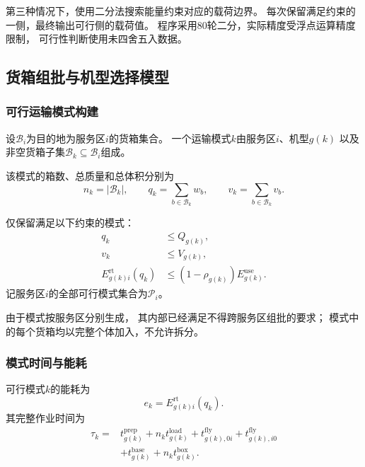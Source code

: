 \documentclass[bwprint]{gmcmthesis}
\begin{document}
第三种情况下，使用二分法搜索能量约束对应的载荷边界。
每次保留满足约束的一侧，最终输出可行侧的载荷值。
程序采用80轮二分，实际精度受浮点运算精度限制，
可行性判断使用未四舍五入数据。

\subsection{货箱组批与机型选择模型}

\subsubsection{可行运输模式构建}

设$\mathcal{B}_i$为目的地为服务区$i$的货箱集合。
一个运输模式$k$由服务区$i$、机型$g(k)$
以及非空货箱子集$\mathcal{B}_k\subseteq\mathcal{B}_i$组成。

该模式的箱数、总质量和总体积分别为
\begin{equation}
    n_k=|\mathcal{B}_k|,
    \qquad
    q_k=\sum_{b\in\mathcal{B}_k}w_b,
    \qquad
    v_k=\sum_{b\in\mathcal{B}_k}v_b.
\end{equation}

仅保留满足以下约束的模式：
\begin{align}
    q_k &\leq Q_{g(k)},\\
    v_k &\leq V_{g(k)},\\
    E_{g(k)i}^{\mathrm{rt}}(q_k)
    &\leq
    (1-\rho_{g(k)})E_{g(k)}^{\mathrm{use}}.
\end{align}
记服务区$i$的全部可行模式集合为$\mathcal{P}_i$。

由于模式按服务区分别生成，
其内部已经满足不得跨服务区组批的要求；
模式中的每个货箱均以完整个体加入，不允许拆分。

\subsubsection{模式时间与能耗}

可行模式$k$的能耗为
\begin{equation}
    e_k=E_{g(k)i}^{\mathrm{rt}}(q_k).
\end{equation}
其完整作业时间为
\begin{equation}
\begin{aligned}
    \tau_k={}&
    t_{g(k)}^{\mathrm{prep}}
    +n_k t_{g(k)}^{\mathrm{load}}
    +t_{g(k),0i}^{\mathrm{fly}}
    +t_{g(k),i0}^{\mathrm{fly}}\\
    &+
    t_{g(k)}^{\mathrm{base}}
    +n_k t_{g(k)}^{\mathrm{box}}.
\end{aligned}
\label{eq:q1_pattern_time}
\end{equation}
\end{document}
